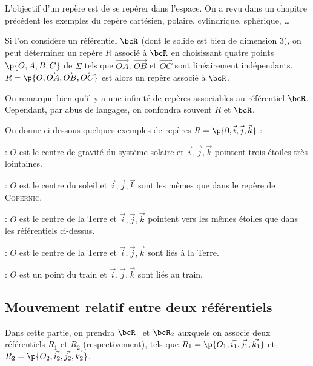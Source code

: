     L'objectif d'un repère est de se repérer dans l'espace. On a revu dans un chapitre précédent les exemples du repère cartésien, polaire, cylindrique, sphérique, \dots\newline
    
    Si l'on considère un référentiel $\bcR$ (dont le solide est bien de dimension 3), on peut déterminer un repère $R$ associé à $\bcR$ en choisissant quatre points $\p{O, A, B, C}$ de $\Sigma$ tels que $\vec{OA}$, $\vec{OB}$ et $\vec{OC}$ sont linéairement indépendants. $R = \p{O, \vec{OA}, \vec{OB}, \vec{OC}}$ est alors un repère associé à $\bcR$.
    
    \begin{enumerate}
        \itt On remarque bien qu'il y a une infinité de repères associables au référentiel $\bcR$. Cependant, par abus de langages, on confondra souvent $R$ et $\bcR$.
    \end{enumerate}
    
    \begin{example}{}{}
        On donne ci-dessous quelques exemples de repères  $R = \p{0, \vec i, \vec j, \vec k}$ :
        \begin{enumerate}
            \itt {} : $O$ est le centre de gravité du système solaire et $\vec i, \vec j, \vec k$ pointent trois étoiles très lointaines.

            \itt {} : $O$ est le centre du soleil et $\vec i, \vec j, \vec k$ sont les mêmes que dans le repère de \textsc{Copernic}.
        
            \itt {} : $O$ est le centre de la Terre et $\vec i, \vec j, \vec k$ pointent vers les mêmes étoiles que dans les référentiels ci-dessus. 

            \itt {} : $O$ est le centre de la Terre et $\vec i, \vec j, \vec k$  sont liés à la Terre. 

            \itt {} : $O$ est un point du train et $\vec i, \vec j, \vec k$ sont liés au train.
        \end{enumerate}
    \end{example}
    
    \subsection{Mouvement relatif entre deux référentiels}
    
    Dans cette partie, on prendra $\bcR_1$ et $\bcR_2$ auxquels on associe deux référentiels $R_1$ et $R_2$ (respectivement), tels que $R_1 = \p{O_1, \vec{i_1}, \vec{j_1}, \vec{k_1}}$ et $R_2 = \p{O_2, \vec{i_2}, \vec{j_2}, \vec{k_2}}$.
    
